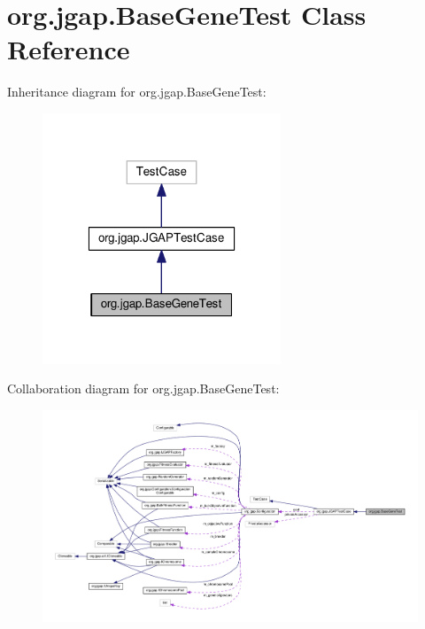 \hypertarget{classorg_1_1jgap_1_1_base_gene_test}{\section{org.\-jgap.\-Base\-Gene\-Test Class Reference}
\label{classorg_1_1jgap_1_1_base_gene_test}
}


Inheritance diagram for org.\-jgap.\-Base\-Gene\-Test\-:
\nopagebreak
\begin{figure}[H]
\begin{center}
\leavevmode
\includegraphics[width=202pt]{classorg_1_1jgap_1_1_base_gene_test__inherit__graph}
\end{center}
\end{figure}


Collaboration diagram for org.\-jgap.\-Base\-Gene\-Test\-:
\nopagebreak
\begin{figure}[H]
\begin{center}
\leavevmode
\includegraphics[width=350pt]{classorg_1_1jgap_1_1_base_gene_test__coll__graph}
\end{center}
\end{figure}
